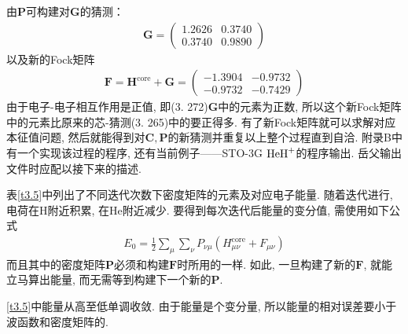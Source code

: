 由$\mathbf{P}$可构建对$\mathbf{G}$的猜测：
\begin{align}
	\mathbf{G}=\begin{pmatrix}
		1.2626&0.3740\\0.3740&0.9890
	\end{pmatrix}
\end{align}
以及新的Fock矩阵
\begin{align}
	\mathbf{F=H}^\mathrm{core}+\mathbf{G}=
	\begin{pmatrix}
		-1.3904&-0.9732 \\ -0.9732&-0.7429
	\end{pmatrix}
\end{align}
由于电子-电子相互作用是正值, 
即(3.
272)$\mathbf{G}$中的元素为正数, 
所以这个新Fock矩阵中的元素比原来的芯-\ha 猜测(3.
265)中的要正得多. 
有了新Fock矩阵就可以求解对应本征值问题, 
然后就能得到对$\mathbf{C,P}$的新猜测并重复以上整个过程直到自洽. 
附录B中有一个实现该过程的程序, 
还有当前例子——STO-3G $\mathrm{HeH}^+$的程序输出. 
岳父输出文件时应配以接下来的描述.


表\ref{t3.5}中列出了不同迭代次数下密度矩阵的元素及对应电子能量. 
随着迭代进行, 
电荷在$\mathrm{H}$附近积累, 
在$\mathrm{He}$附近减少. 
要得到每次迭代后能量的变分值, 
需使用如下公式
\begin{align}
	E_0 = \frac{1}{2}\sum_\mu\sum_\nu P_{\nu\mu}(H_{\mu\nu}^\mathrm{core}+F_{\mu\nu})
\end{align}
而且其中的密度矩阵$\mathbf{P}$必须和构建$\mathbf{F}$时所用的一样. 
如此, 
一旦构建了新的$\mathbf{F}$, 
就能立马算出能量, 
而无需等到构建下一个新的$\mathbf{P}$. 

\ref{t3.5}中能量从高至低单调收敛. 由于能量是个变分量, 所以能量的相对误差要小于波函数和密度矩阵的. 

